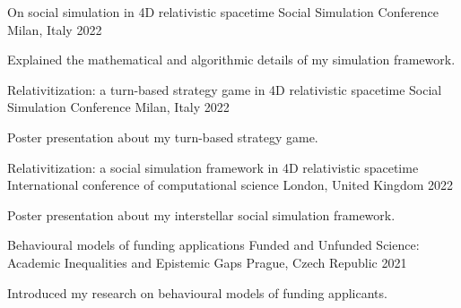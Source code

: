 

\begin{cventries}


  \cventry
    {On social simulation in 4D relativistic spacetime} %
    {Social Simulation Conference} %
    {Milan, Italy} %
    {2022} %
    {
      \begin{cvitems} %
        \item {Explained the mathematical and algorithmic details of my simulation framework.}
      \end{cvitems}
    }

  \cventry
    {Relativitization: a turn-based strategy game in 4D relativistic spacetime} %
    {Social Simulation Conference} %
    {Milan, Italy} %
    {2022} %
    {
      \begin{cvitems} %
        \item {Poster presentation about my turn-based strategy game.}
      \end{cvitems}
    }

  \cventry
    {Relativitization: a social simulation framework in 4D relativistic spacetime} %
    {International conference of computational science} %
    {London, United Kingdom} %
    {2022} %
    {
      \begin{cvitems} %
        \item {Poster presentation about my interstellar social simulation framework.}
      \end{cvitems}
    }

  \cventry
    {Behavioural models of funding applications} %
    {Funded and Unfunded Science: Academic Inequalities and Epistemic Gaps} %
    {Prague, Czech Republic} %
    {2021} %
    {
      \begin{cvitems} %
        \item {Introduced my research on behavioural models of funding applicants.}
      \end{cvitems}
    }


\end{cventries}
